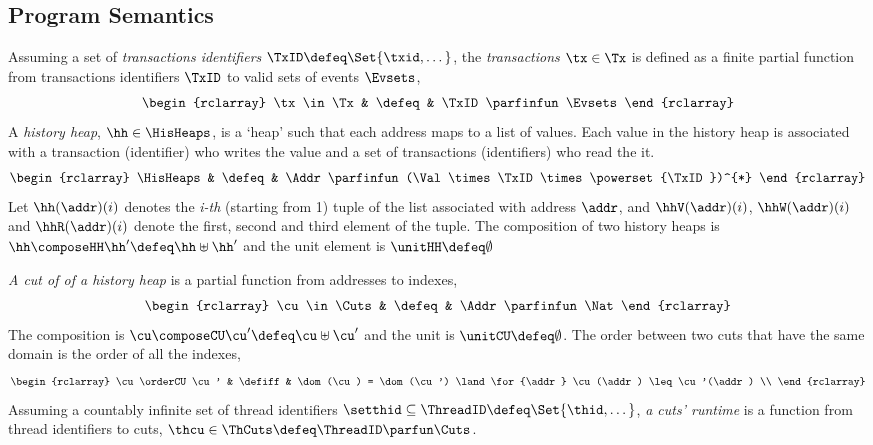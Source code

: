 \subsection{Program Semantics}
\begin{defn}
\label{def:his_heap}
Assuming a set of \emph{transactions identifiers} \( \TxID \defeq \Set{\txid, \dots}\), the \emph{transactions} \( \tx \in \Tx \) is defined as a finite partial function from transactions identifiers \( \TxID \) to valid sets of events \( \Evsets \),
\[
\begin{rclarray}
\tx \in \Tx & \defeq & \TxID \parfinfun \Evsets
\end{rclarray}
\]
A \emph{history heap}, \( \hh \in \HisHeaps \), is a `heap' such that each address maps to a list of values.
Each value in the history heap is associated with a transaction (identifier) who writes the value and a set of transactions (identifiers) who read the it.
\[
\begin{rclarray}
    \HisHeaps & \defeq & \Addr \parfinfun (\Val \times \TxID \times \powerset{\TxID})^{*}
\end{rclarray}
\]
Let \( \hh(\addr)(i)\) denotes the \emph{i-th} (starting from 1) tuple of the list associated with address \( \addr \), and \( \hhV(\addr)(i) \), \( \hhW(\addr)(i) \) and \( \hhR(\addr)(i) \) denote the first, second and third element of the tuple.
The composition of two history heaps is \( \hh \composeHH \hh' \defeq \hh \uplus \hh' \) and the unit element is \( \unitHH \defeq \emptyset \)
\end{defn}

\begin{defn}
\label{def:cuts}
\emph{A cut of of a history heap} is a partial function from addresses to indexes,
\[
\begin{rclarray}
    \cu \in \Cuts & \defeq & \Addr \parfinfun \Nat
\end{rclarray}
\]                                                                     
The composition is \( \cu \composeCU \cu' \defeq \cu \uplus \cu'\) and the unit is \( \unitCU \defeq \emptyset\).
The order between two cuts that have the same domain is the order of all the indexes, 
\[
\begin{rclarray}
    \cu \orderCU \cu' & \defiff & \dom(\cu) = \dom(\cu') \land \for{\addr} \cu(\addr) \leq \cu'(\addr) \\
\end{rclarray}
\]
Assuming a countably infinite set of thread identifiers \( \setthid \subseteq \ThreadID \defeq \Set{\thid, \dots} \), \emph{a cuts' runtime} is a function from thread identifiers to cuts, \ie \( \thcu \in \ThCuts \defeq \ThreadID \parfun \Cuts\).
\end{defn}

